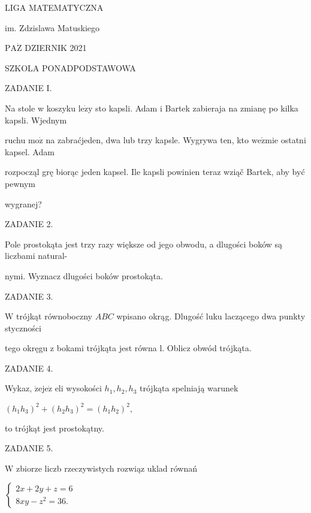 \documentclass[a4paper,12pt]{article}
\begin{document}
LIGA MATEMATYCZNA

im. Zdzislawa Matuskiego

$\mathrm{P}\mathrm{A}\dot{\mathrm{Z}}$ DZIERNIK 2021

SZKOLA PONADPODSTAWOWA

ZADANIE I.

Na stole w koszyku $\mathrm{l}\mathrm{e}\dot{\mathrm{z}}\mathrm{y}$ sto kapsli. Adam i Bartek zabieraja na zmianę po kilka kapsli. Wjednym

ruchu $\mathrm{m}\mathrm{o}\dot{\mathrm{z}}$ na zabraćjeden, dwa lub trzy kapsle. Wygrywa ten, kto $\mathrm{w}\mathrm{e}\acute{\mathrm{z}}\mathrm{m}\mathrm{i}\mathrm{e}$ ostatni kapsel. Adam

rozpocząl grę biorąc jeden kapsel. Ile kapsli powinien teraz wziąč Bartek, aby być pewnym

wygranej?

ZADANIE 2.

Pole prostokąta jest trzy razy większe od jego obwodu, a dlugości boków są liczbami natural-

nymi. Wyznacz dlugości boków prostokąta.

ZADANIE 3.

$\mathrm{W}$ trójkąt równoboczny $ABC$ wpisano okrąg. Dlugość luku laczącego dwa punkty styczności

tego okręgu z bokami trójkąta jest równa l. Oblicz obwód trójkąta.

ZADANIE 4.

Wykaz, $\dot{\mathrm{z}}\mathrm{e}\mathrm{j}\mathrm{e}\dot{\mathrm{z}}$ eli wysokości $h_{1}, h_{2}, h_{3}$ trójkąta spelniają warunek

$(h_{1}h_{3})^{2}+(h_{2}h_{3})^{2}=(h_{1}h_{2})^{2},$

to trójkąt jest prostokątny.

ZADANIE 5.

$\mathrm{W}$ zbiorze liczb rzeczywistych rozwiąz uklad równań

$\left\{\begin{array}{l}
2x+2y+z=6\\
8xy-z^{2}=36.
\end{array}\right.$
\end{document}
